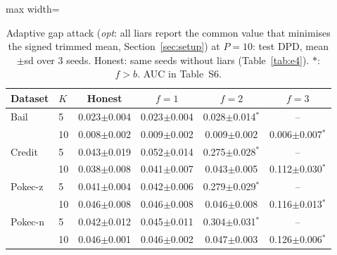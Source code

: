 \begin{table}[tbp]
\centering
\footnotesize
\setlength{\tabcolsep}{3pt}
\caption{Adaptive gap attack (\emph{opt}: all liars report the common value that minimises the signed trimmed mean, Section~\ref{sec:setup}) at $P=10$: test DPD, mean$\pm$sd over 3 seeds. Honest: same seeds without liars (Table~\ref{tab:e4}). $\ast$: $f>b$. AUC in Table~S6.}
\label{tab:e7}
\begin{adjustbox}{max width=\textwidth}
\begin{tabular}{llcccc}
\toprule
Dataset & $K$ & Honest & $f=1$ & $f=2$ & $f=3$ \\
\midrule
Bail & 5 & 0.023$\pm$0.004 & 0.023$\pm$0.004 & 0.028$\pm$0.014$^\ast$ & -- \\
 & 10 & 0.008$\pm$0.002 & 0.009$\pm$0.002 & 0.009$\pm$0.002 & 0.006$\pm$0.007$^\ast$ \\
Credit & 5 & 0.043$\pm$0.019 & 0.052$\pm$0.014 & 0.275$\pm$0.028$^\ast$ & -- \\
 & 10 & 0.038$\pm$0.008 & 0.041$\pm$0.007 & 0.043$\pm$0.005 & 0.112$\pm$0.030$^\ast$ \\
Pokec-z & 5 & 0.041$\pm$0.004 & 0.042$\pm$0.006 & 0.279$\pm$0.029$^\ast$ & -- \\
 & 10 & 0.046$\pm$0.008 & 0.046$\pm$0.008 & 0.046$\pm$0.008 & 0.116$\pm$0.013$^\ast$ \\
Pokec-n & 5 & 0.042$\pm$0.012 & 0.045$\pm$0.011 & 0.304$\pm$0.031$^\ast$ & -- \\
 & 10 & 0.046$\pm$0.001 & 0.046$\pm$0.002 & 0.047$\pm$0.003 & 0.126$\pm$0.006$^\ast$ \\
\bottomrule
\end{tabular}
\end{adjustbox}
\end{table}

